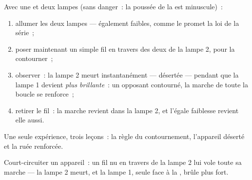 \begin{method}\label{met:g7:short-circuits-safety:demo}
Avec une  et deux lampes  (sans danger~: la poussée de la
 est minuscule)~:
\begin{enumerate}
  \item allumer les deux lampes --- également faibles, comme le
        promet la loi de la série~;
  \item poser maintenant un simple fil en travers des deux  de
        la lampe 2, pour la contourner~;
  \item observer~: la lampe 2 meurt instantanément --- désertée ---
        pendant que la lampe 1 devient \emph{plus brillante}~: un
        opposant contourné, la marche de toute la boucle se
        renforce~;
  \item retirer le fil~: la marche revient dans la lampe 2, et
        l'égale faiblesse revient elle aussi.
\end{enumerate}
Une seule expérience, trois leçons~: la règle du contournement,
l'appareil déserté et la ruée renforcée.
\end{method}

\begin{omfigure}

{\small Court-circuiter un appareil~: un fil nu en travers de la
lampe 2 lui vole toute sa marche --- la lampe 2 meurt, et la lampe 1,
seule face à la , brûle plus fort.}
\end{omfigure}

